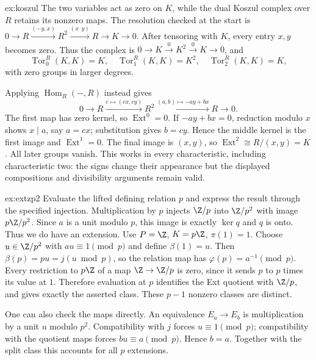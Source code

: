 \begin{solution}{ex:koszul}
\idea The two variables act as zero on $K$, while the dual Koszul complex over $R$ retains its nonzero maps.
\writeup The resolution checked at the start is
$0\to R\xrightarrow{(-y,x)}R^2\xrightarrow{(x\ \ y)}R\to K\to0$.
After tensoring with $K$, every entry $x,y$ becomes zero. Thus the complex is $0\to K\xrightarrow0K^2\xrightarrow0K\to0$, and
\[
\operatorname{Tor}_0^R(K,K)=K,\quad
\operatorname{Tor}_1^R(K,K)=K^2,\quad
\operatorname{Tor}_2^R(K,K)=K,
\]
with zero groups in larger degrees.

Applying $\operatorname{Hom}_R(-,R)$ instead gives
\[
0\longrightarrow R\xrightarrow{c\mapsto(cx,cy)}R^2
\xrightarrow{(a,b)\mapsto-ay+bx}R\longrightarrow0.
\]
The first map has zero kernel, so $\operatorname{Ext}^0=0$. If $-ay+bx=0$, reduction modulo $x$ shows $x\mid a$, say $a=cx$; substitution gives $b=cy$. Hence the middle kernel is the first image and $\operatorname{Ext}^1=0$. The final image is $(x,y)$, so
$\operatorname{Ext}^2\cong R/(x,y)=K$. All later groups vanish. This works in every characteristic, including characteristic two: the signs change their appearance but the displayed compositions and divisibility arguments remain valid.
\end{solution}

\begin{solution}{ex:extzp2}
\idea Evaluate the lifted defining relation $p$ and express the result through the specified injection.
\writeup Multiplication by $p$ injects $\Z/p$ into $\Z/p^2$ with image $p\Z/p^2$. Since $a$ is a unit modulo $p$, this image is exactly $\ker q$ and $q$ is onto. Thus we do have an extension.
Use $P=\Z$, $K=p\Z$, $\pi(1)=1$. Choose $u\in\Z/p^2$ with $au\equiv1\pmod p$ and define $\beta(1)=u$. Then
$\beta(p)=pu=j(u\bmod p)$, so the relation map has $\varphi(p)=a^{-1}\pmod p$.
Every restriction to $p\Z$ of a map $\Z\to\Z/p$ is zero, since it sends $p$ to $p$ times its value at $1$. Therefore evaluation at $p$ identifies the Ext quotient with $\Z/p$, and gives exactly the asserted class. These $p-1$ nonzero classes are distinct.

One can also check the maps directly. An equivalence $E_a\to E_b$ is multiplication by a unit $u$ modulo $p^2$. Compatibility with $j$ forces $u\equiv1\pmod p$; compatibility with the quotient maps forces $bu\equiv a\pmod p$. Hence $b=a$. Together with the split class this accounts for all $p$ extensions.
\end{solution}

